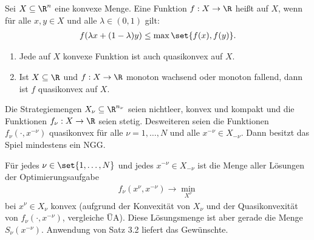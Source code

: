 \begin{definition}
  Sei $X \subseteq \R^{n}$ eine konvexe Menge. Eine Funktion $f:X \to \R$ heißt  auf $X$, wenn für alle $x, y \in X$ und alle $\lambda \in (0, 1)$ gilt:
  \begin{align*}
    f(\lambda x + (1- \lambda)y) \leq \max \set{f(x), f(y)}. 
  \end{align*}
\end{definition}
\begin{bemerkung*}
  \begin{enumerate}
  \item Jede auf $X$ konvexe Funktion ist auch quasikonvex auf $X$. 
  \item Ist $X \subseteq \R$ und $f: X \to \R$ monoton wachsend oder monoton fallend, dann ist $f$ quasikonvex auf $X$. 
  \end{enumerate}
\end{bemerkung*}
\begin{korollar}
  Die Strategiemengen $X_{\nu} \subseteq \R^{n_{\nu}}$ seien nichtleer, konvex und kompakt und die Funktionen $f_{\nu}: X \to \R$ seien stetig. Desweiteren seien die Funktionen $f_{\nu}(\cdot, x^{-\nu})$  quasikonvex für alle $\nu = 1, \dots, N$ und alle $x^{-\nu} \in X_{-\nu}$. Dann besitzt das Spiel mindestens ein NGG. 
\end{korollar}
\begin{beweis}
  Für jedes $\nu \in \set{1,\dots, N}$ und jedes $x^{-\nu} \in X_{-\nu}$ ist die Menge aller Lösungen der Optimierungsaufgabe
  \begin{align}\label{eq:set_solutions}
    f_{\nu}(x^{\nu}, x^{-\nu}) \to \min_{X^{\nu}}
  \end{align}
bei $x^{\nu} \in X_{\nu}$ konvex (aufgrund der Konvexität von $X_{\nu}$ und der Quasikonvexität von $f_{\nu}(\cdot, x^{-\nu})$, vergleiche ÜA). Diese Lösungsmenge ist aber gerade die Menge $S_{\nu}(x^{-\nu})$. Anwendung von Satz 3.2 liefert das Gewünschte. 
\end{beweis}

